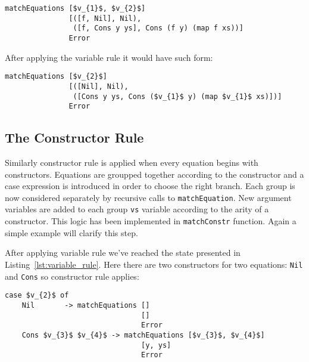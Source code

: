 \documentclass[a4paper]{report}
\begin{document}
\begin{lstlisting}[mathescape=true]
matchEquations [$v_{1}$, $v_{2}$]
               [([f, Nil], Nil),
                ([f, Cons y ys], Cons (f y) (map f xs))]
               Error
\end{lstlisting}
After applying the variable rule it would have such form:
\begin{lstlisting}[label=lst:variable_rule, caption={State after applying
  variable rule.}, mathescape=true]
matchEquations [$v_{2}$]
               [([Nil], Nil),
                ([Cons y ys, Cons ($v_{1}$ y) (map $v_{1}$ xs)])]
               Error
\end{lstlisting}

\subsection{The Constructor Rule}
\label{sec:constructor_rule}
Similarly constructor rule is applied when every equation begins with
constructors. Equations are groupped together according to the constructor and
a case expression is introduced in order to choose the right branch. Each group
is now considered separately by recursive calls to \texttt{matchEquation}. New
argument variables are added to each group \texttt{vs} variable according to
the arity of a constructor. This logic has been implemented in
\texttt{matchConstr} function. Again a simple example will clarify this step.

After applying variable rule we've reached the state presented in
Listing~\ref{lst:variable_rule}. Here there are two constructors for two
equations: \texttt{Nil} and \texttt{Cons} so constructor rule applies:

\begin{lstlisting}[label=lst:constructor_rule, caption={State after applying
  constructor rule.}, mathescape=true]
case $v_{2}$ of
    Nil       -> matchEquations []
                                []
                                Error
    Cons $v_{3}$ $v_{4}$ -> matchEquations [$v_{3}$, $v_{4}$]
                                [y, ys]
                                Error
\end{lstlisting}
\end{document}
